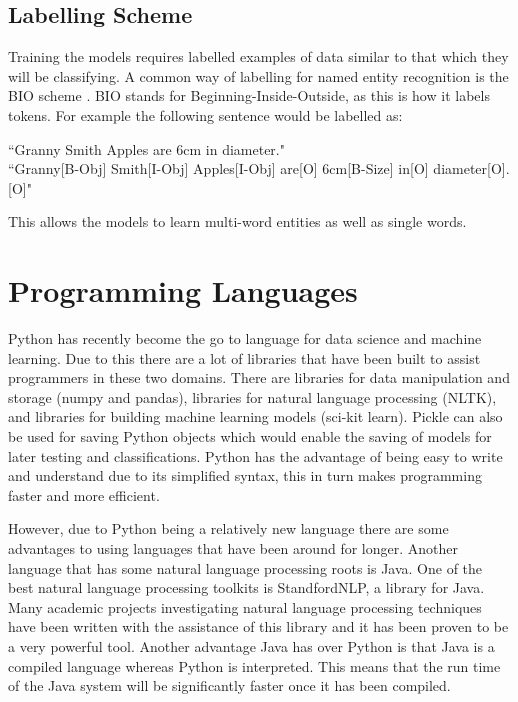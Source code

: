 \documentclass[11pt,oneside]{book}
\begin{document}
\subsection{Labelling Scheme}
Training the models requires labelled examples of data similar to that which they will be classifying. A common way of labelling for named entity recognition is the BIO scheme \citep{bio}. BIO stands for Beginning-Inside-Outside, as this is how it labels tokens. For example the following sentence would be labelled as:

\begin{displayquote}
“Granny Smith Apples are 6cm in diameter." \\
“Granny[B-Obj] Smith[I-Obj] Apples[I-Obj] are[O] 6cm[B-Size] in[O] diameter[O].[O]"
\end{displayquote}

\noindent This allows the models to learn multi-word entities as well as single words.

\section{Programming Languages}
Python has recently become the go to language for data science and machine learning. Due to this there are a lot of libraries that have been built to assist programmers in these two domains. There are libraries for data manipulation and storage (numpy and pandas), libraries for natural language processing (NLTK), and libraries for building machine learning models (sci-kit learn). Pickle can also be used for saving Python objects which would enable the saving of models for later testing and classifications. Python has the advantage of being easy to write and understand due to its simplified syntax, this in turn makes programming faster and more efficient.

However, due to Python being a relatively new language there are some advantages to using languages that have been around for longer. Another language that has some natural language processing roots is Java. One of the best natural language processing toolkits is StandfordNLP, a library for Java. Many academic projects investigating natural language processing techniques have been written with the assistance of this library and it has been proven to be a very powerful tool. Another advantage Java has over Python is that Java is a compiled language whereas Python is interpreted. This means that the run time of the Java system will be significantly faster once it has been compiled.
\end{document}
